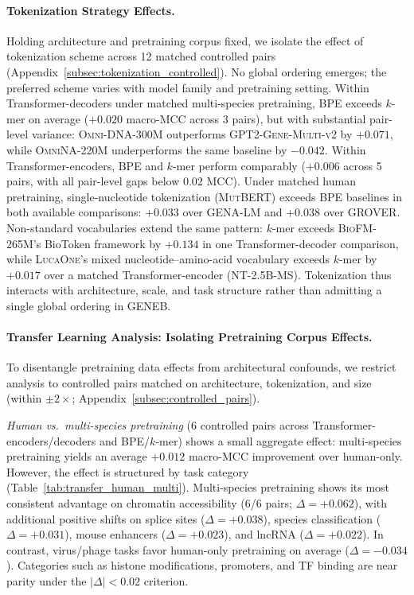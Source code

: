 \documentclass{article}
\theoremstyle{plain}
\theoremstyle{definition}
\theoremstyle{remark}
\begin{document}
\paragraph{Tokenization Strategy Effects.}
Holding architecture and pretraining corpus fixed, we isolate the
effect of tokenization scheme across 12 matched controlled pairs
(Appendix~\ref{subsec:tokenization_controlled}). No global ordering
emerges; the preferred scheme varies with model family and
pretraining setting. Within Transformer-decoders under matched
multi-species pretraining, BPE exceeds $k$-mer on average ($+0.020$
macro-MCC across 3 pairs), but with substantial pair-level variance:
\textsc{Omni-DNA-300M} outperforms \textsc{GPT2-Gene-Multi-v2} by
$+0.071$, while \textsc{OmniNA-220M} underperforms the same baseline
by $-0.042$. Within Transformer-encoders, BPE and $k$-mer perform comparably
($+0.006$ across 5 pairs, with all pair-level gaps below $0.02$ MCC). Under matched human pretraining,
single-nucleotide tokenization (\textsc{MutBERT}) exceeds BPE baselines in both available comparisons: $+0.033$ over \textsc{GENA-LM} and
$+0.038$ over \textsc{GROVER}. Non-standard vocabularies extend
the same pattern: $k$-mer exceeds \textsc{BioFM-265M}'s BioToken
framework by $+0.134$ in one Transformer-decoder comparison, while
\textsc{LucaOne}'s mixed nucleotide--amino-acid vocabulary exceeds
$k$-mer by $+0.017$ over a matched Transformer-encoder
(\textsc{NT-2.5B-MS}).
Tokenization thus interacts with architecture, scale, and task
structure rather than admitting a single global ordering in GENEB.

\paragraph{Transfer Learning Analysis: Isolating Pretraining Corpus Effects.}
To disentangle pretraining data effects from architectural confounds,
we restrict analysis to controlled pairs matched on architecture,
tokenization, and size (within $\pm 2\times$;
Appendix~\ref{subsec:controlled_pairs}).

\textit{Human vs.\ multi-species pretraining} (6 controlled pairs
across Transformer-encoders/decoders and BPE/$k$-mer) shows a small
aggregate effect: multi-species pretraining yields an average
$+0.012$ macro-MCC improvement over human-only. However, the effect
is structured by task category
(Table~\ref{tab:transfer_human_multi}). Multi-species pretraining
shows its most consistent advantage on chromatin accessibility
(6/6 pairs; $\Delta=+0.062$), with additional positive shifts on
splice sites ($\Delta=+0.038$), species classification
($\Delta=+0.031$), mouse enhancers ($\Delta=+0.023$), and lncRNA
($\Delta=+0.022$). In contrast, virus/phage tasks favor human-only
pretraining on average ($\Delta=-0.034$). Categories such as histone
modifications, promoters, and TF binding are near parity under the
$|\Delta|<0.02$ criterion.
\end{document}
